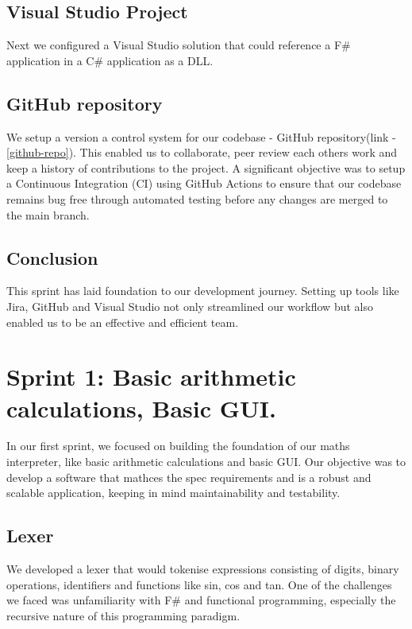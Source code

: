 \documentclass[a4paper, oneside, 11pt]{report}
\begin{document}
\subsection{Visual Studio Project}
Next we configured a Visual Studio solution that could reference a F\# application in a C\# application as a DLL\cite{DLL}.

\subsection{GitHub repository}
We setup a version a control system for our codebase - GitHub repository(link - \ref{github-repo}). This enabled us to collaborate, peer review each others work and keep a history of contributions to the project. A significant objective was to setup a Continuous Integration (CI)\cite{Atlassian:CI} using GitHub Actions\cite{GitHubDocs:Actions} to ensure that our codebase remains bug free through automated testing before any changes are merged to the main branch.

\subsection{Conclusion}
This sprint has laid foundation to our development journey. Setting up tools like Jira, GitHub and Visual Studio not only streamlined our workflow but also enabled us to be an effective and efficient team.

\section{Sprint 1: Basic arithmetic calculations, Basic GUI.}
In our first sprint, we focused on building the foundation of our maths interpreter, like basic arithmetic calculations and basic GUI. Our objective was to develop a software that mathces the spec requirements and is a robust and scalable application, keeping in mind maintainability and testability.

\subsection{Lexer}
We developed a lexer that would tokenise expressions consisting of digits, binary operations, identifiers and functions like sin, cos and tan. One of the challenges we faced was unfamiliarity with F\# and functional programming, especially the recursive nature of this programming paradigm. 
\end{document}
